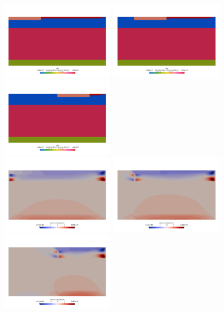\begin{center}
\includegraphics[width=5.7cm]{python_codes/fieldstone_143/results/fig9/eta0000}
\includegraphics[width=5.7cm]{python_codes/fieldstone_143/results/fig9/eta1000}
\includegraphics[width=5.7cm]{python_codes/fieldstone_143/results/fig9/eta3000}\\
\includegraphics[width=5.7cm]{python_codes/fieldstone_143/results/fig9/u0000}
\includegraphics[width=5.7cm]{python_codes/fieldstone_143/results/fig9/u1000}
\includegraphics[width=5.7cm]{python_codes/fieldstone_143/results/fig9/u3000}\\

\end{center}
